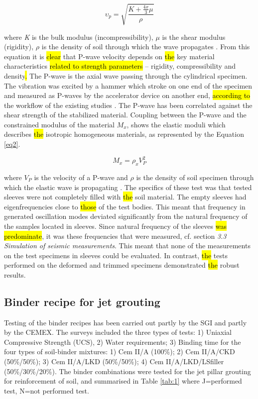 \documentclass[USenglish,twocolumn]{article}
\begin{document}
\begin{equation} \label{eq2}
	\upsilon_p=\sqrt{\frac{K+\frac{4x}{3}\mu}{\rho} }
\end{equation}

where \emph{K} is the bulk modulus (incompressibility), $\mu$ is the shear modulus (rigidity), $\rho$ is the density of soil through which the wave propagates \cite{Fowler}. From this equation it is \hl{clear} that P-wave velocity depends on \hl{the} key material characteristics \hl{related to strength parameters }-- rigidity, compressibility and density\hl{. }The P-wave is the axial wave passing through the cylindrical specimen. The vibration was excited by a hammer which stroke on one end of the specimen and measured as P-waves by the accelerator device on another end, \hl{according to} the workflow of the existing studies \cite{ma15217798}. The P-wave has been correlated against the shear strength of the stabilized material. Coupling between the P-wave and the constrained modulus of the material $M_x$, shows the elastic moduli which describes \hl{the} isotropic homogeneous materials, as represented by the Equation \ref{eq2}.

\begin{equation} \label{eq2}
	M_x=\rho_x V_P^2
\end{equation}

where $V_P$ is the velocity of a P-wave and $\rho$ is the density of soil specimen through which the elastic wave is propagating \cite{Mavko}. The specifics of these test was that\hl{ }tested sleeves were not completely filled with \hl{the} soil material. The empty sleeves had eigenfrequencies close to \hl{those} of the test bodies. This meant that\hl{ }frequency in generated oscillation modes deviated significantly from the natural frequency of the samples located in sleeves. Since\hl{ }natural frequency of the sleeves \hl{was predominate}, it was these frequencies that were measured, cf. section \emph{3.3 Simulation of seismic measurements}. This meant that none of the measurements on the test specimens in sleeves could be evaluated. In contrast, \hl{the} tests performed on the deformed and trimmed specimens demonstrated \hl{the }robust results.

\subsection{Binder recipe for jet grouting}
Testing of the binder recipes has been carried out partly by the SGI and partly by the CEMEX. The surveys included the three types of tests: 1) Uniaxial Compressive Strength (UCS), 2) Water requirements; 3) Binding time for the four types of soil-binder mixtures: 1) Cem II/A (100\%); 2) Cem II/A/CKD (50\%/50\%); 3) Cem II/A/LKD (50\%/50\%); 4) Cem II/A/LKD/LSfiller (50\%/30\%/20\%). The binder combinations were tested for the jet pillar grouting for reinforcement of soil, and summarised in Table \ref{tab:1} where J=performed test, N=not performed test.
\end{document}
